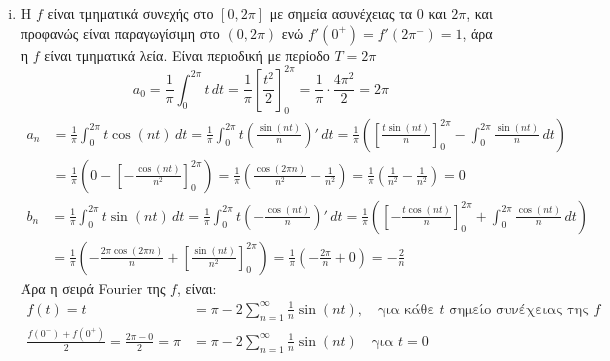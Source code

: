 \begin{solution}
  \begin{enumerate}[i)]
    \item Η $f$ είναι τμηματικά συνεχής στο $ [0,2 \pi] $ με σημεία ασυνέχειας τα $ 0 $ 
      και $ 2 \pi $, και προφανώς είναι παραγωγίσιμη στο $ (0,2 \pi) $ ενώ 
      $ f'(0^{+}) = f'(2 \pi ^{-}) = 1  $, άρα η $f$ είναι τμηματικά λεία. 
      Είναι περιοδική με περίοδο 
      $ T=2 \pi $ 
      \[
        a_{0} = \frac{1}{\pi} \int _{0}^{2 \pi} t\,{dt} = \frac{1}{\pi}
        \left[\frac{t^{2}}{2}\right]_{0}^{2 \pi} = \frac{1}{\pi} \cdot 
        \frac{4 \pi ^{2}}{2} = 2 \pi
      \] 
      \begin{align*}
        a_{n} &= \frac{1}{\pi} \int _{0}^{2 \pi} t \cos{(nt)} \,{dt} = \frac{1}{\pi} 
        \int _{0}^{2 \pi} t \left(\frac{\sin{(nt)}}{n}\right)' \,{dt} = \frac{1}{\pi}
        \left(\left[\frac{t \sin{(nt)}}{n} \right]_{0}^{2 \pi} - \int _{0}^{2 \pi}
        \frac{\sin{(nt)}}{n} \,{dt}\right) \\ 
              &= \frac{1}{\pi} \left(0 - \left[- \frac{\cos{(nt)}}{n^{2}}\right]_{0}^{2 
                \pi}\right) = \frac{1}{\pi} \left(\frac{\cos{(2 \pi n)}}{n^{2}} - 
                \frac{1}{n^{2}}\right) = \frac{1}{\pi} \left(\frac{1}{n^{2}} - 
              \frac{1}{n^{2}}\right) = 0
      \end{align*} 
      \begin{align*}
        b_{n} &= \frac{1}{\pi} \int _{0}^{2 \pi} t \sin{(nt)} \,{dt} = \frac{1}{\pi} 
        \int _{0}^{2 \pi } t \left(- \frac{\cos{(nt)}}{n}\right)' \,{dt} = \frac{1}{\pi}
        \left(\left[- \frac{t \cos{(nt)}}{n} \right]_{0}^{2 \pi} + \int _{0}^{2 \pi}
        \frac{\cos{(nt)}}{n} \,{dt}\right) \\
              &= \frac{1}{\pi} \left(- \frac{2 \pi \cos{(2 \pi n)}}{n} + \left[
              \frac{\sin{(nt)}}{n^{2}}\right]_{0}^{2 \pi}\right) = 
              \frac{1}{\pi} \left(- \frac{2 \pi}{n} + 0\right) = - \frac{2}{n} 
      \end{align*}
      Άρα η σειρά Fourier της $f$, είναι:
      \begin{align*}
        f(t) = t &= \pi - 2\sum_{n=1}^{\infty} \frac{1}{n} \sin{(nt)} , 
        \quad \text{για κάθε $t$ σημείο συνέχειας της $f$} \\
        \frac{f(0^{-})+f(0^{+})}{2} = \frac{2 \pi - 0 }{2} = \pi 
                 &= \pi - 2\sum_{n=1}^{\infty} \frac{1}{n} \sin{(nt)} 
                 \quad \text{για $t=0$} 
      \end{align*}


\end{enumerate}
\end{solution}
